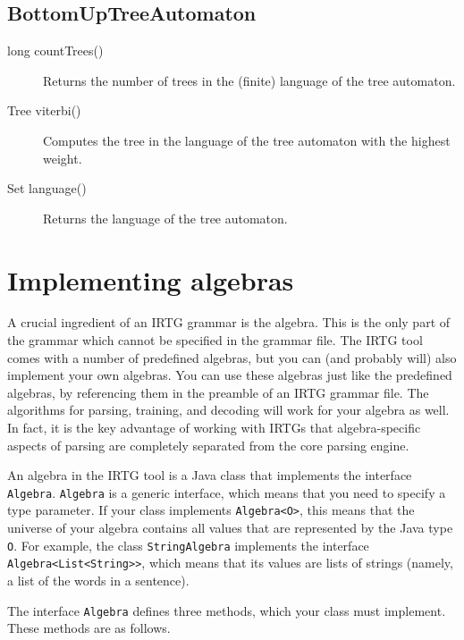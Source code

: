 \documentclass[11pt]{article}
\begin{document}
\subsection{BottomUpTreeAutomaton}

\begin{description}
\item[long countTrees()] Returns the number of trees in the (finite)
  language of the tree automaton.
\item[Tree viterbi()] Computes the tree in the language of the tree
  automaton with the highest weight.
\item[Set language()] Returns the language of the tree automaton.
\end{description}




\section{Implementing algebras} \label{sec:algebra}

A crucial ingredient of an IRTG grammar is the algebra. This is the
only part of the grammar which cannot be specified in the grammar
file. The IRTG tool comes with a number of predefined algebras, but
you can (and probably will) also implement your own algebras. You can
use these algebras just like the predefined algebras, by referencing
them in the preamble of an IRTG grammar file. The algorithms for
parsing, training, and decoding will work for your algebra as well. In
fact, it is the key advantage of working with IRTGs that
algebra-specific aspects of parsing are completely separated from the
core parsing engine.

An algebra in the IRTG tool is a Java class that implements the
interface \verb?Algebra?.  \verb?Algebra? is a generic interface,
which means that you need to specify a type parameter.  If your class
implements \verb?Algebra<O>?, this means that the universe of your
algebra contains all values that are represented by the Java type
\verb?O?.  For example, the class \verb?StringAlgebra? implements the
interface \verb?Algebra<List<String>>?, which means that its values
are lists of strings (namely, a list of the words in a sentence).

The interface \verb?Algebra? defines three methods, which your class
must implement. These methods are as follows.
\end{document}
